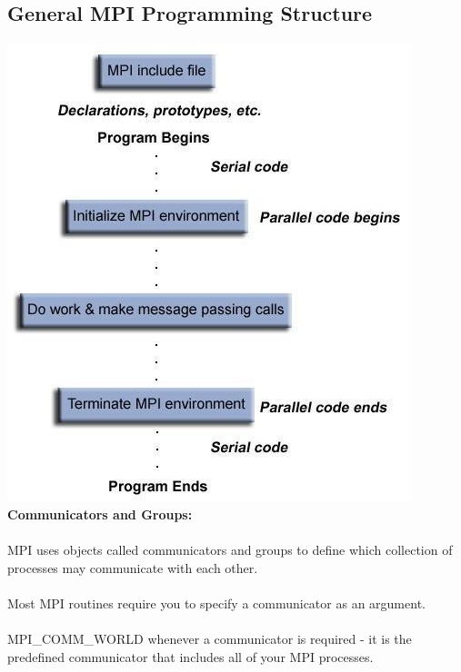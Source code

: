 \documentclass[10pt,a4paper]{article}
\begin{document}
	\subsection{General MPI Programming Structure}
		\includegraphics[width=\textwidth]{MPI_03}
\newpage		
\textbf{Communicators and Groups:} \\ \\
MPI uses objects called communicators and groups to define which collection of processes may communicate with each other.\\ \\
Most MPI routines require you to specify a communicator as an argument.\\ \\ 
MPI\_COMM\_WORLD whenever a communicator is required - it is the predefined communicator that includes all of your MPI processes. \\ \\
\end{document}

